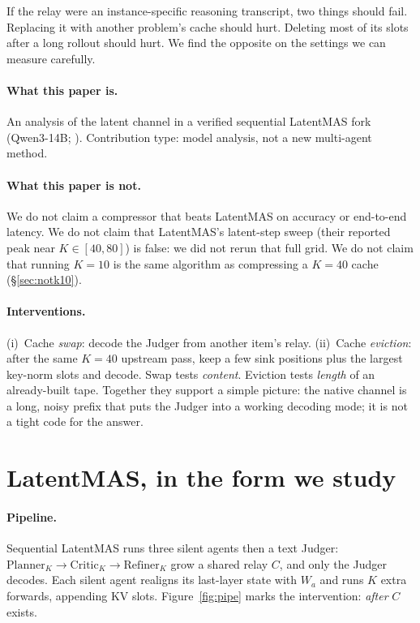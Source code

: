 \documentclass[11pt]{article}
\begin{document}
If the relay were an instance-specific reasoning transcript, two things should
fail. Replacing it with another problem's cache should hurt. Deleting most of
its slots after a long rollout should hurt. We find the opposite on the
settings we can measure carefully.

\paragraph{What this paper is.}
An analysis of the latent channel in a verified sequential LatentMAS
fork (Qwen3-14B; \citealp{qwen3}).
Contribution type: model analysis, not a new multi-agent method.

\paragraph{What this paper is not.}
We do not claim a compressor that beats LatentMAS on accuracy or
end-to-end latency. We do not claim that LatentMAS's latent-step sweep
(their reported peak near $K{\in}[40,80]$) is false: we did not rerun that
full grid. We do not claim that running $K{=}10$ is the same algorithm as
compressing a $K{=}40$ cache (\S\ref{sec:notk10}).

\paragraph{Interventions.}
(i)~Cache \emph{swap}: decode the Judger from another item's relay.
(ii)~Cache \emph{eviction}: after the same $K{=}40$ upstream pass, keep a
few sink positions plus the largest key-norm slots and decode.
Swap tests \emph{content}. Eviction tests \emph{length} of an already-built
tape. Together they support a simple picture: the native channel is a long,
noisy prefix that puts the Judger into a working decoding mode; it is not a
tight code for the answer.

\section{LatentMAS, in the form we study}
\label{sec:setup}

\paragraph{Pipeline.}
Sequential LatentMAS runs three silent agents then a text Judger:
$\mathrm{Planner}_K \to \mathrm{Critic}_K \to \mathrm{Refiner}_K$
grow a shared relay $C$, and only the Judger decodes.
Each silent agent realigns its last-layer state with $W_a$ and runs $K$
extra forwards, appending KV slots.
Figure~\ref{fig:pipe} marks the intervention: \emph{after} $C$ exists.
\end{document}
